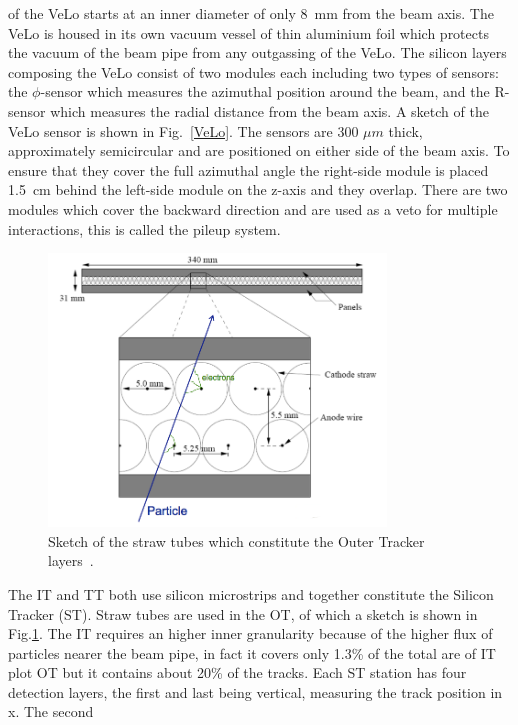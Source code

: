 of the VeLo starts at an inner diameter of only 8~mm from the beam axis. The VeLo is housed in its own
vacuum vessel of thin aluminium foil which protects the vacuum of the beam pipe from any outgassing of
the VeLo. The silicon layers composing the VeLo consist of two modules each including two types of sensors:
the $\phi$-sensor which measures the azimuthal position around the beam, and the R-sensor which measures
the radial distance from the beam axis. A sketch of the VeLo sensor is shown in Fig.~\ref{VeLo}. The sensors
are 300 $\mu m$ thick, approximately semicircular and are positioned on either side of the beam axis.
To ensure that they cover the full azimuthal angle the right-side module is placed 1.5~cm behind the left-side
module on the z-axis and they overlap. There are two modules which cover the backward direction
and are used as a veto for multiple interactions, this is called the pileup system.
%
\begin{center}
\begin{figure}[h!]
\centering 
\includegraphics[width=0.8\textwidth]{Detector/figs/straw_tubes.png}
\caption{Sketch of the straw tubes which constitute the Outer Tracker layers~\cite{Alves:2008zz}.}
\label{fig:straw:tubes}
\end{figure}
\end{center}
%
The IT and TT both use silicon microstrips and together constitute the Silicon Tracker (ST). Straw tubes are used 
in the OT, of which a sketch is shown in Fig.\ref{fig:straw:tubes}. The IT requires an higher inner granularity
because of the higher flux of particles nearer the beam pipe, in fact it covers only 1.3\% of the total
are of IT plot OT but it contains about 20\% of the tracks. Each ST station has four detection layers,
the first and last being vertical, measuring the track position in x. The second 
